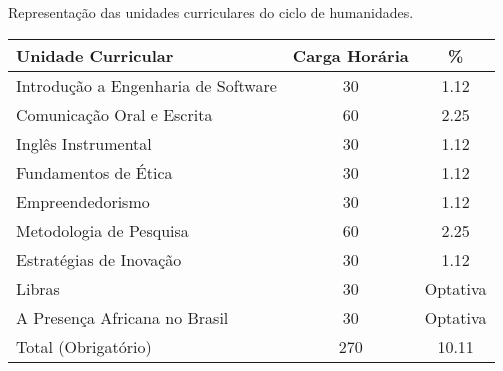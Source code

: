 \begin{quadro}[ht!]
\caption{Representação das unidades curriculares do ciclo de humanidades.}
\label{quad:ead}
\centering
\begin{tabular}{|l|c|c|}
\hline
\rowcolor{blue1}
 Unidade Curricular &    Carga Horária  & \%\\
\hline
Introdução a Engenharia de Software & 30 & 1.12 \\
Comunicação Oral e Escrita & 60 & 2.25 \\
Inglês Instrumental & 30 & 1.12 \\
Fundamentos de Ética & 30 & 1.12 \\
Empreendedorismo & 30 & 1.12 \\
Metodologia de Pesquisa & 60 & 2.25 \\
Estratégias de Inovação & 30 & 1.12 \\
\hline
Libras & 30 & Optativa \\
A Presença Africana no Brasil & 30 & Optativa \\
\hline
Total (Obrigatório) & 270 & 10.11\\
\hline
\end{tabular}
\end{quadro}